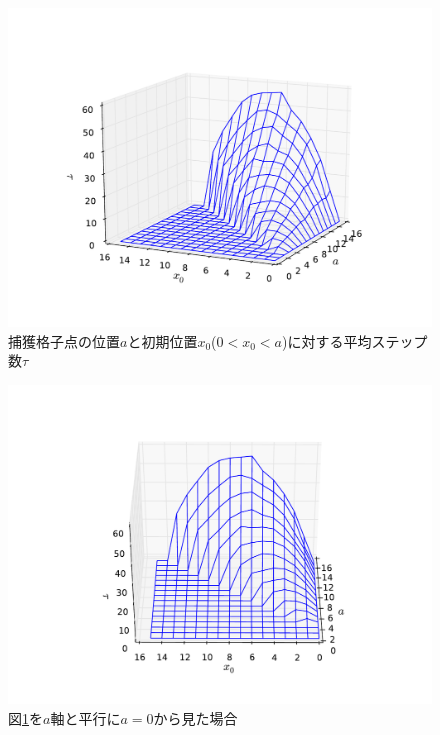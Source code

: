 \documentclass{jsarticle}
\begin{document}
\begin{enumerate}
\begin{enumerate}
                    \begin{figure}[H]
                        \begin{center}
                        \includegraphics[width=14.0cm]{figure_3.pdf}
                        \caption{捕獲格子点の位置$a$と初期位置$x_{0}$($0<x_{0}<a$)に対する平均ステップ数$\tau$}
                        \label{fig:1}
                    \end{center}
                    \end{figure}

                    \begin{figure}[H]
                        \begin{center}
                        \includegraphics[width=12.5cm]{figure_2.pdf}
                        \caption{図\ref{fig:1}を$a$軸と平行に$a=0$から見た場合}
                        \label{fig:2}
                    \end{center}
                    \end{figure}





\end{enumerate}
\end{enumerate}
\end{document}
